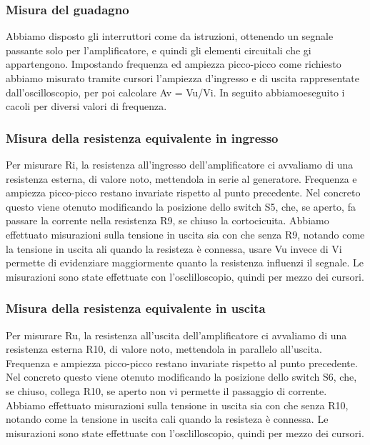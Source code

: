 \documentclass[a4paper]{article}
\begin{document}
			\subsubsection{Misura del guadagno}
				Abbiamo disposto gli interruttori come da istruzioni, ottenendo un segnale passante solo per l'amplificatore, e quindi gli elementi circuitali che gi appartengono. %
				Impostando frequenza ed ampiezza picco-picco come richiesto abbiamo misurato tramite cursori l'ampiezza d'ingresso e di uscita rappresentate dall'oscilloscopio, per poi calcolare Av = Vu/Vi.
				In seguito abbiamoeseguito i cacoli per diversi valori di frequenza.
			\subsubsection{Misura della resistenza equivalente in ingresso}
				Per misurare Ri, la resistenza all'ingresso dell'amplificatore ci avvaliamo di una resistenza esterna, di valore noto, mettendola in serie al generatore.
				Frequenza e ampiezza picco-picco restano invariate rispetto al punto precedente. 
				Nel concreto questo viene otenuto modificando la  posizione dello switch S5, che, se aperto, fa passare la corrente nella resistenza R9, se chiuso la cortocicuita.
				Abbiamo effettuato misurazioni sulla tensione in uscita sia con che senza R9, notando come la tensione in uscita ali quando la resisteza è connessa, usare Vu invece di Vi permette di evidenziare maggiormente quanto la resistenza influenzi il segnale. %
				Le misurazioni sono state effettuate con l'osclilloscopio, quindi per mezzo dei cursori.
			\subsubsection{Misura della resistenza equivalente in uscita}	
				Per misurare Ru, la resistenza all'uscita dell'amplificatore ci avvaliamo di una resistenza esterna R10, di valore noto, mettendola in parallelo all'uscita.
				Frequenza e ampiezza picco-picco restano invariate rispetto al punto precedente. 
				Nel concreto questo viene otenuto modificando la  posizione dello switch S6, che, se chiuso, collega R10, se aperto non vi permette il passaggio di corrente.
				Abbiamo effettuato misurazioni sulla tensione in uscita sia con che senza R10, notando come la tensione in uscita cali quando la resisteza è connessa. %
				Le misurazioni sono state effettuate con l'osclilloscopio, quindi per mezzo dei cursori.
\end{document}
